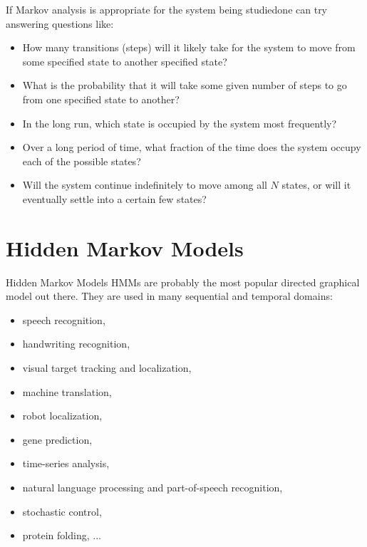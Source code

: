 \documentclass[c]{beamer}
\begin{document}
\begin{frame}
  If  Markov analysis is appropriate for the system being studiedone can try answering questions like:
\begin{itemize}
  \item How many transitions (steps) will it likely take for the system to move from some specified state to another specified state?
  \item What is the probability that it will take some given number of steps to go from one specified state to another?
  \item In the long run, which state is occupied by the system most frequently?
  \item Over a long period of time, what fraction of the time does the system occupy each of the possible states?
  \item Will the system continue indefinitely to move among all $N$ states, or will it eventually settle into a certain few states?
\end{itemize}
\end{frame}


\section{Hidden Markov Models}


\begin{frame}{Hidden Markov Models}
  HMMs are probably the most popular directed graphical model out there. They are used in many sequential and temporal domains:
  \begin{itemize}
    \item speech recognition,
    \item handwriting recognition,
    \item visual target tracking and localization,
    \item machine translation,
    \item robot localization,
    \item gene prediction,
    \item time-series analysis,
    \item natural language processing and part-of-speech recognition,
    \item stochastic control,
    \item protein folding, ...
  \end{itemize}
\end{frame}
\end{document}
